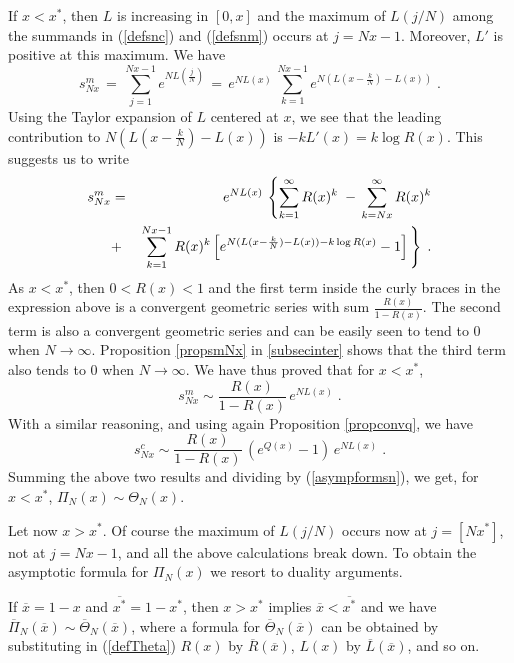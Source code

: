 \documentclass[12pt]{article}
\begin{document}
If $x<x^{\ast}$, then $L$ is increasing in $[0,x]$ and the maximum of $L(j/N)$ among the summands in (\ref{defsnc}) and (\ref{defsnm}) occurs at $j=Nx-1$. Moreover, $L'$ is positive at this maximum. We have
\[s_{Nx}^m\,=\, \sum_{j=1}^{Nx-1}e^{NL(\frac{j}{N})}\,=\, e^{NL(x)} \, \sum_{k=1}^{Nx-1}e^{N(L(x-\frac{k}{N})-L(x))}\;.\]
Using the Taylor expansion of $L$ centered at $x$, we see that the leading contribution to $N(L(x-\frac{k}{N})-L(x))$ is $-k L'(x)= k \log R(x)$. This suggests us to write
\begin{eqnarray}
s_{Nx}^m&=& e^{NL(x)} \,\left\{\sum_{k=1}^{\infty}R(x)^k \right. \,-\, \sum_{k=Nx}^{\infty}R(x)^k \nonumber \\
&+& \left. \sum_{k=1}^{Nx-1}R(x)^k\left[e^{N(L(x-\frac{k}{N})-L(x))-k \log R(x)}-1 \right]\rule{0cm}{0.5cm} \right\}\;.\nonumber
\end{eqnarray}
As $x<x^{\ast}$, then $0<R(x)<1$ and the first term inside the curly braces in the expression above is a convergent geometric series with sum $\frac{R(x)}{1-R(x)}$. The second term is also a convergent geometric series and can be easily seen to tend to 0 when $N \rightarrow\infty$. Proposition \ref{propsmNx} in \ref{subsecinter} shows that the third term also tends to 0 when $N \rightarrow\infty$. We have thus proved that for $x<x^{\ast}$,
\begin{equation}
s_{Nx}^m \sim \frac{R(x)}{1-R(x)} \, e^{NL(x)} \;.
\end{equation}
With a similar reasoning, and using again Proposition \ref{propconvq}, we have 
\begin{equation}
s_{Nx}^c \sim \frac{R(x)}{1-R(x)} \, (e^{Q(x)}-1)\, e^{NL(x)} \;.
\end{equation}
Summing the above two results and dividing by (\ref{asympformsn}), we get, for $x< x^{\ast}$, $\Pi_N(x) \sim \Theta_N(x)$.

Let now $x>x^{\ast}$. Of course the maximum of $L(j/N)$ occurs now at $j=[N x^{\ast}]$, not at $j=Nx-1$, and all the above calculations break down. To obtain the asymptotic formula for $\Pi_N(x)$ we resort to duality arguments. 

If $\overline{x}=1-x$ and $\overline{x^{\ast}}=1-x^{\ast}$, then $x>x^{\ast}$ implies $\overline{x}< \overline{x^{\ast}}$ and we have $\overline \Pi_N(\overline x) \sim \overline \Theta_N(\overline x)$, where a formula for $\overline \Theta_N(\overline x)$ can be obtained by substituting in (\ref{defTheta}) $R(x)$ by $\overline R(\overline x)$, $L(x)$ by $\overline L(\overline x)$, and so on.
\end{document}
